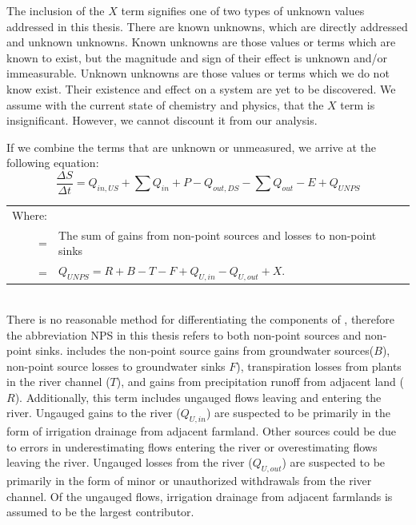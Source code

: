 The inclusion of the $ X $ term signifies one of two types of unknown values addressed in this thesis.  There are known unknowns, which are directly addressed and unknown unknowns.  Known unknowns are those values or terms which are known to exist, but the magnitude and sign of their effect is unknown and/or immeasurable.  Unknown  unknowns are those values or terms which we do not know exist.  Their existence and effect on a system are yet to be discovered.  We assume with the current state of chemistry and physics, that the $ X $ term is insignificant.  However, we cannot discount it from our analysis.

If we combine the terms that are unknown or unmeasured, we arrive at the following equation:
\begin{equation}
	\label{eq:water01}
	\frac{\Delta S}{\Delta t} = Q_{in,US} + \sum Q_{in} + P - Q_{out,DS} - \sum Q_{out} - E + Q_{UNPS}
\end{equation}
\begin{tabular}{r p{5.5in}}
	Where: \\
	\Qnps = & The sum of gains from non-point sources and losses to non-point sinks \\
		= &$ Q_{UNPS} = R + B - T - F + Q_{U,in} - Q_{U,out} +X $.\\ 
\end{tabular}\\

There is no reasonable method for differentiating the components of \Qnps, therefore the abbreviation NPS in this thesis refers to both non-point sources and non-point sinks.   \Qnps includes the non-point source gains from groundwater sources($ B $), non-point source losses to groundwater sinks {}$ F $), transpiration losses from plants in the river channel ($ T $), and gains from precipitation runoff from adjacent land ($ R $).  Additionally, this term includes ungauged flows leaving and entering the river.  Ungauged gains to the river ($ Q_{U,in} $) are suspected to be primarily in the form of irrigation drainage from adjacent farmland.  Other sources could be due to errors in underestimating flows entering the river or overestimating flows leaving the river.  Ungauged losses from the river ($ Q_{U,out} $) are suspected to be primarily in the form of minor or unauthorized withdrawals from the river channel.  Of the ungauged flows, irrigation drainage from adjacent farmlands is assumed to be the largest contributor.

